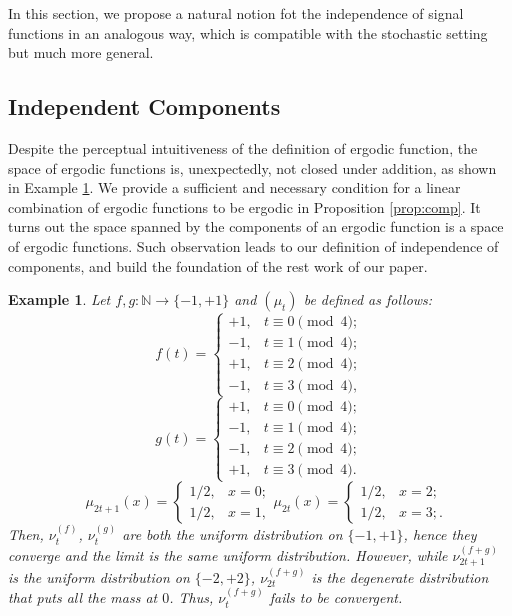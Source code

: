 \documentclass[twoside]{article}
\renewcommand{\natural}{\mathbb{N}}
\newtheorem{example}[lemma]{Example}
\theoremstyle{definition}
\begin{document}
In this section, we propose a natural notion fot the independence of signal functions in an analogous way, which is compatible with the stochastic setting but much more general.
\subsection{Independent Components}
\label{subsec:IndeComp}
Despite the perceptual intuitiveness of the definition of ergodic function, the space of ergodic functions is, unexpectedly, not closed under addition, as shown in Example \ref{eg:ergodic}. 
We provide a sufficient and necessary condition for a linear combination 
of ergodic functions to be ergodic in Proposition \ref{prop:comp}. 
It turns out the space spanned by the components of an ergodic function is a space of ergodic functions.
Such observation leads to our definition of independence of components, and build the foundation of the rest work of our paper.
\begin{example}
\label{eg:ergodic}
Let $f,g:\natural \rightarrow \{-1,+1\}$ and $(\mu_t)$ be defined as follows: 
\[
f(t) = \begin{cases} +1, & t \equiv 0 \pmod 4; \\
					-1, & t \equiv 1 \pmod 4; \\
					+1,  & t \equiv 2  \pmod 4; \\
					-1, & t \equiv 3  \pmod 4,
					\end{cases}
					\]\[
g(t) = \begin{cases} +1, & t\equiv 0 \pmod 4; \\
					-1, & t\equiv 1 \pmod 4; \\
					-1,  & t\equiv 2 \pmod 4; \\
					+1, & t\equiv 3 \pmod 4.
					\end{cases}
\]
\[
\quad \mu_{2t+1}(x) = \begin{cases} 1/2, & x=0; \\
					1/2, & x=1, 
					\end{cases}
\mu_{2t}(x) = \begin{cases} 1/2, & x=2; \\
					1/2, & x=3;.
					\end{cases}
\]
Then, $\nu^{(f)}_t$, $\nu^{(g)}_t$ are both the uniform  distribution on $\{-1,+1\}$, hence they converge and the limit is the same uniform  distribution. 
However, while $\nu^{(f+g)}_{2t+1}$ is the uniform  distribution on $\{-2,+2\}$,  $\nu^{(f+g)}_{2t}$ is the degenerate
distribution that puts all the mass at $0$. Thus, $\nu^{(f+g)}_{t}$ fails to be convergent. 
\end{example}
\end{document}

